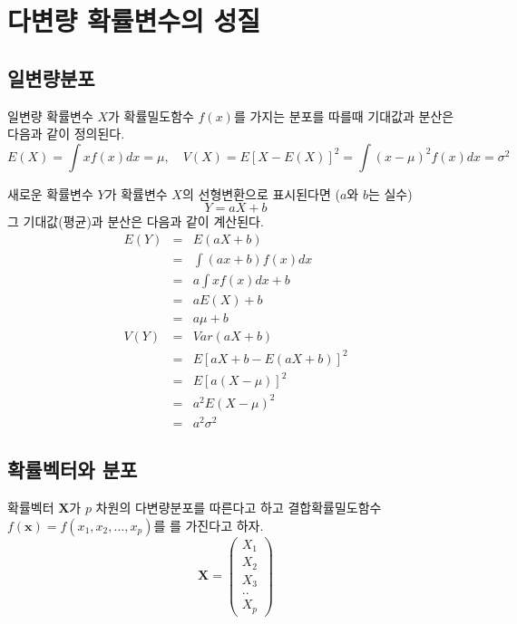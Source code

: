 \documentclass[
]{book}
\theoremstyle{definition}
\theoremstyle{definition}
\theoremstyle{definition}
\theoremstyle{remark}
\begin{document}
\hypertarget{appendix-appendix}{%
\appendix {}}


\hypertarget{mulivar}{%
\chapter{다변량 확률변수의 성질}\label{mulivar}}

\hypertarget{uxc77cuxbcc0uxb7c9uxbd84uxd3ec}{%
\section{일변량분포}\label{uxc77cuxbcc0uxb7c9uxbd84uxd3ec}}

일변량 확률변수 \(X\)가 확률밀도함수 \(f(x)\)를 가지는 분포를 따를때 기대값과 분산은 다음과 같이 정의된다.
\[ E(X) = \int x f(x)  dx = \mu, \quad V(X) = E[ X-E(X)]^2=\int (x-\mu)^2 f(x) dx =\sigma^2 \]

새로운 확률변수 \(Y\)가 확률변수 \(X\)의 선형변환으로 표시된다면 (\(a\)와 \(b\)는 실수)
\[ Y = aX+b\]
그 기대값(평균)과 분산은 다음과 같이 계산된다.
\begin{eqnarray*}
E(Y) &=& E(aX+b) \\
&=& \int (ax+b) f(x) dx \\
&=& a \int x f(x) dx + b \\
&=& a E(X) + b\\
&=& a \mu + b \\
V(Y) &=& Var(aX+b) \\
&=& E[aX+b -E(aX+b)]^2 \\
&=& E[a(X-\mu)]^2 \\
&=& a^2 E(X-\mu)^2\\
&=& a^2 \sigma^2
\end{eqnarray*}

\hypertarget{uxd655uxb960uxbca1uxd130uxc640-uxbd84uxd3ec}{%
\section{확률벡터와 분포}\label{uxd655uxb960uxbca1uxd130uxc640-uxbd84uxd3ec}}

확률벡터 \(\bm X\)가 \(p\) 차원의 다변량분포를 따른다고 하고 결합확률밀도함수 \(f(\bm x) =f(x_1,x_2,\dots,x_p)\)를
를 가진다고 하자.
\begin{equation*}
\bm X =
  \begin{pmatrix}
X_1 \\
X_2 \\
X_3 \\
..  \\
X_p
\end{pmatrix}
\end{equation*}
\end{document}
